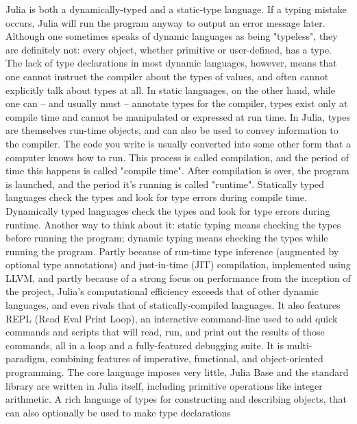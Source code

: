 \documentclass{article}
\begin{document}
Julia is both a dynamically-typed and a static-type language. If a typing mistake occurs, Julia will run the program anyway to output an error message later. 
Although one sometimes speaks of dynamic languages as being "typeless", they are definitely not: every object, whether primitive or user-defined, has a type. The lack of type declarations in most dynamic languages, however, means that one cannot instruct the compiler about the types of values, and often cannot explicitly talk about types at all. In static languages, on the other hand, while one can – and usually must – annotate types for the compiler, types exist only at compile time and cannot be manipulated or expressed at run time. In Julia, types are themselves run-time objects, and can also be used to convey information to the compiler.
The code you write is usually converted into some other form that a computer knows how to run. This process is called compilation, and the period of time this happens is called "compile time".
After compilation is over, the program is launched, and the period it's running is called "runtime".
Statically typed languages check the types and look for type errors during compile time.
Dynamically typed languages check the types and look for type errors during runtime.
Another way to think about it: static typing means checking the types before running the program; dynamic typing means checking the types while running the program.
Partly because of run-time type inference (augmented by optional type annotations) and just-in-time (JIT) compilation, implemented using LLVM, and partly because of a strong focus on performance from the inception of the project, Julia's computational efficiency exceeds that of other dynamic languages, and even rivals that of statically-compiled languages. 
It also features REPL (Read Eval Print Loop), an interactive command-line used to add quick commands and scripts that will read, run, and print out the results of those commands, all in a loop and a fully-featured debugging suite.
It is multi-paradigm, combining features of imperative, functional, and object-oriented programming.  
The core language imposes very little, Julia Base and the standard library are written in Julia itself, including primitive operations like integer arithmetic.
A rich language of types for constructing and describing objects, that can also optionally be used to make type declarations
\end{document}
